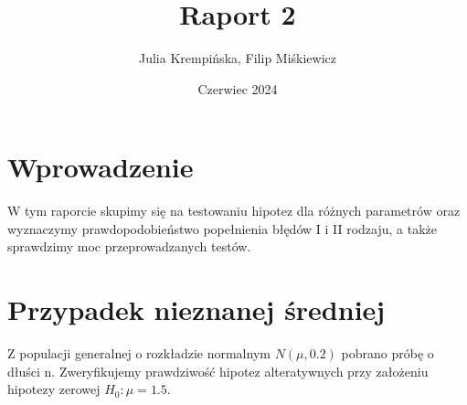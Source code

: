 \documentclass{article}
\title{\textbf{Raport 2}}
\author{Julia Krempińska, Filip Miśkiewicz}
\date{Czerwiec 2024}
\begin{document}
\maketitle

\section{Wprowadzenie}
W tym raporcie skupimy się na testowaniu hipotez dla różnych parametrów oraz wyznaczymy prawdopodobieństwo popełnienia błędów I i II rodzaju, a także sprawdzimy moc przeprowadzanych testów. %

\section{Przypadek nieznanej średniej}
Z populacji generalnej o rozkładzie normalnym $N(\mu, 0.2)$ pobrano próbę o dłuści n. Zweryfikujemy prawdziwość hipotez alteratywnych przy założeniu hipotezy zerowej $H_{0}: \mu = 1.5$. 
\end{document}
